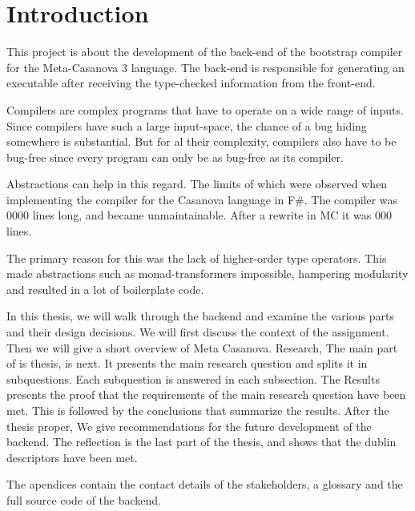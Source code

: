 \section{Introduction}
This project is about the development of the back-end of the bootstrap compiler for the Meta-Casanova 3 language.
The back-end is responsible for generating an executable after receiving the type-checked information from the front-end.

Compilers are complex programs that have to operate on a wide range of inputs.
Since compilers have such a large input-space, the chance of a bug hiding somewhere is substantial. 
But for al their complexity, compilers also have to be bug-free since every program can only be as bug-free as its compiler.

Abstractions can help in this regard.
The limits of which were observed when implementing the compiler for the Casanova language in F\#.
The compiler was 0000 lines long, and became unmaintainable.
After a rewrite in MC it was 000 lines\cite{maggiore}.

The primary reason for this was the lack of higher-order type operators.
This made abstractions such as monad-transformers impossible, hampering modularity and resulted in a lot of boilerplate code.

In this thesis, we will walk through the backend and examine the various parts and their design decisions.
We will first discuss the context of the assignment.
Then we will give a short overview of Meta Casanova.
Research, The main part of is thesis, is next.
It presents the main research question and splits it in subquestions.
Each subquestion is answered in each subsection.
The Results presents the proof that the requirements of the main research question have been met.
This is followed by the conclusions that summarize the results.
After the thesis proper, We give recommendations for the future development of the backend.
The reflection is the last part of the thesis, and shows that the dublin descriptors have been met.

The apendices contain the contact details of the stakeholders, a glossary and the full source code of the backend.




